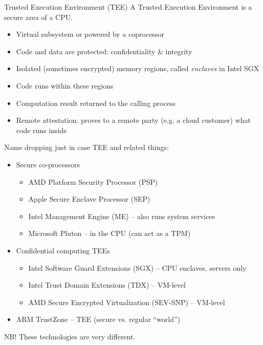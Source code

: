 \begin{frame}{Trusted Execution Environment (TEE)}
  A Trusted Execution Environment is a secure area of a CPU.
  \begin{itemize}[<+(1)->]
    \item Virtual subsystem or powered by a coprocessor
    \item Code and data are protected: confidentiality \& integrity
    \item Isolated (sometimes encrypted) memory regions, called \emph{enclaves} in Intel SGX
    \item Code runs within these regions
    \item Computation result returned to the calling process
    \item Remote attestation: proves to a remote party (e.g. a cloud customer) what code runs inside
  \end{itemize}  
\end{frame}

\begin{frame}{Name dropping just in case}
  TEE and related things:
  \begin{itemize}[<+(1)->]
    \item Secure co-processors
    \par
    \begin{itemize}
      \item AMD Platform Security Processor (PSP)
      \item Apple Secure Enclave Processor (SEP)
      \item Intel Management Engine (ME) -- also runs system services
      \item Microsoft Pluton -- in the CPU (can act as a TPM)
    \end{itemize}
    \item Confidential computing TEEs
    \par
    \begin{itemize}
      \item Intel Software Guard Extensions (SGX) -- CPU enclaves, servers only
      \item Intel Trust Domain Extensions (TDX) -- VM-level
      \item AMD Secure Encrypted Virtualization (SEV-SNP) -- VM-level
    \end{itemize}
    \item ARM TrustZone -- TEE (secure vs. regular \enquote{world})
  \end{itemize}

  \pause
  NB! These technologies are very different.
\end{frame}

